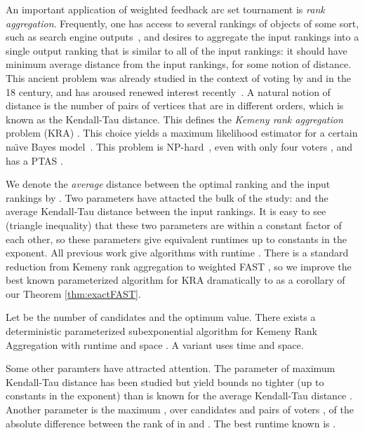 \documentclass[envcountsame,oribibl]{llncs}
\newcommand{\fast}{\textsc{FAST}}
\begin{document}
\medskip

An important application of weighted feedback arc set tournament is {\em rank aggregation}. Frequently, one has access to several rankings of objects of some sort, such as search engine outputs~\citep{Dwork01}, and desires to aggregate the input rankings into a single output ranking that is similar to all of the input rankings: it should have minimum {average distance} from the input rankings, for some notion of distance. This ancient problem was already studied in the context of voting by \citep{Borda} and \citep{Condorcet} in the 18 century, and has aroused renewed interest recently~\citep{Dwork01,Conitzer06b}.  A natural notion of distance is the number of pairs of vertices that are in different orders, which is known as the Kendall-Tau distance. This defines the {\em Kemeny rank aggregation} problem (KRA) \citep{Kemeny59,Kemeny62}. This choice yields a maximum likelihood estimator for a certain na\"\i{}ve Bayes model~\citep{Young95}. This problem is NP-hard~\citep{Bartholdi89}, even with only four voters \citep{Dwork01}, and has a PTAS \cite{Mathieu09fast}.

We denote the \emph{average} distance between the optimal ranking and the input rankings by . Two parameters have attacted the bulk of the study:  and the average Kendall-Tau distance between the input rankings. It is easy to see (triangle inequality) that these two parameters are within a constant factor of each other, so these parameters give equivalent runtimes up to constants in the exponent. All previous work give algorithms with runtime  \cite{Betzler09}. There is a standard reduction from Kemeny rank aggregation to weighted \fast{} \cite{Ailon08aggregating,Coppersmith06,Mathieu09fast}, so we improve the best known parameterized algorithm for KRA dramatically to  as a corollary of our Theorem \ref{thm:exactFAST}.

\begin{corollary} \label{thm:exactKRA}
Let  be the number of candidates and  the optimum value. There exists a deterministic parameterized subexponential algorithm for Kemeny Rank Aggregation with runtime and space . A variant uses  time and  space.
\end{corollary}

Some other paramters have attracted attention. The parameter of maximum Kendall-Tau distance has been studied but yield bounds no tighter (up to constants in the exponent) than is known for the average Kendall-Tau distance \cite{Betzler09}. Another parameter is the maximum , over candidates  and pairs of voters , of the absolute difference between the rank of  in  and . The best runtime known is  \cite{Betzler09}.
\end{document}

